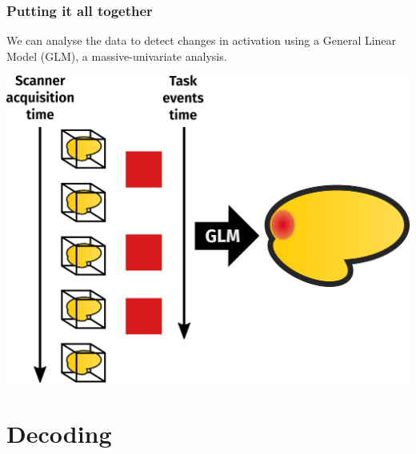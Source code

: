 \documentclass[11pt]{beamer}
\begin{document}
\begin{frame}
    \frametitle{Putting it all together}
    
    We can analyse the data to detect changes in activation using a General
    Linear Model (GLM), a massive-univariate analysis.

    \begin{center}
        \includegraphics[scale=0.15]{figures/glm.png}
    \end{center}

\end{frame}

\section{Decoding}
\label{sec:Decoding}
\end{document}
